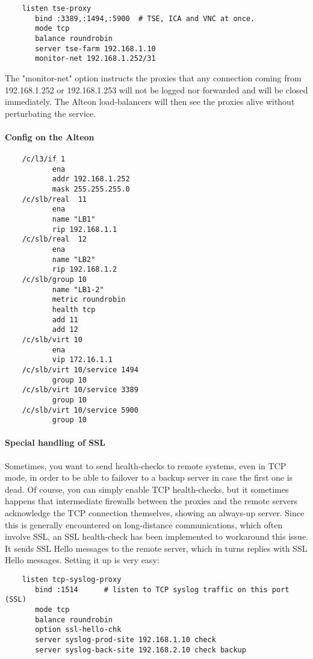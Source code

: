 \begin{verbatim}    
    listen tse-proxy
       bind :3389,:1494,:5900  # TSE, ICA and VNC at once.
       mode tcp
       balance roundrobin
       server tse-farm 192.168.1.10
       monitor-net 192.168.1.252/31
\end{verbatim}

The "monitor-net" option instructs the proxies that any connection coming from
192.168.1.252 or 192.168.1.253 will not be logged nor forwarded and will be
closed immediately. The Alteon load-balancers will then see the proxies alive
without perturbating the service.

\paragraph{Config on the Alteon}

\begin{verbatim}
    /c/l3/if 1
           ena
           addr 192.168.1.252
           mask 255.255.255.0
    /c/slb/real  11
           ena
           name "LB1"
           rip 192.168.1.1
    /c/slb/real  12
           ena
           name "LB2"
           rip 192.168.1.2
    /c/slb/group 10
           name "LB1-2"
           metric roundrobin
           health tcp
           add 11
           add 12
    /c/slb/virt 10
           ena
           vip 172.16.1.1
    /c/slb/virt 10/service 1494
           group 10
    /c/slb/virt 10/service 3389
           group 10
    /c/slb/virt 10/service 5900
           group 10
\end{verbatim}

\paragraph{Special handling of SSL}

Sometimes, you want to send health-checks to remote systems, even in TCP mode,
in order to be able to failover to a backup server in case the first one is
dead. Of course, you can simply enable TCP health-checks, but it sometimes
happens that intermediate firewalls between the proxies and the remote servers
acknowledge the TCP connection themselves, showing an always-up server. Since
this is generally encountered on long-distance communications, which often
involve SSL, an SSL health-check has been implemented to workaround this issue.
It sends SSL Hello messages to the remote server, which in turns replies with
SSL Hello messages. Setting it up is very easy:

\begin{verbatim}
    listen tcp-syslog-proxy
       bind :1514      # listen to TCP syslog traffic on this port (SSL)
       mode tcp
       balance roundrobin
       option ssl-hello-chk
       server syslog-prod-site 192.168.1.10 check
       server syslog-back-site 192.168.2.10 check backup
\end{verbatim}


